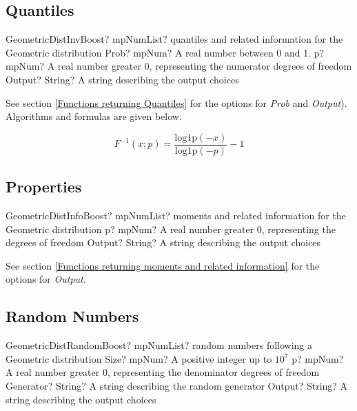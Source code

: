 \subsection{Quantiles}

\begin{mpFunctionsExtract}
	\mpFunctionThreeNotImplemented
	{GeometricDistInvBoost? mpNumList? quantiles and related information for the Geometric distribution}
	{Prob? mpNum? A real number between 0 and 1.}
	{p? mpNum? A real number greater 0, representing the numerator  degrees of freedom}
	{Output? String? A string describing the output choices}
\end{mpFunctionsExtract}

See section \ref{Functions returning Quantiles} for the options for  {\itshape\sffamily Prob} and {\itshape\sffamily Output}). Algorithms and formulas are given below.

\begin{equation} 
	F^{-1}(x;p)= \frac{\text{log1p}(-x)}{\text{log1p}(-p)} -1
\end{equation}



\subsection{Properties}
\label{GeometricDistributionProperties}


\begin{mpFunctionsExtract}
	\mpFunctionTwoNotImplemented
	{GeometricDistInfoBoost? mpNumList? moments and related information for the Geometric distribution}
	{p? mpNum? A real number greater 0, representing the degrees of freedom}
	{Output? String? A string describing the output choices}
\end{mpFunctionsExtract}

\vspace{0.3cm}

See section \ref{Functions returning moments and related information} for the options for {\itshape\sffamily Output}. 




\subsection{Random Numbers}
\begin{mpFunctionsExtract}
	\mpFunctionFourNotImplemented
	{GeometricDistRandomBoost? mpNumList? random numbers following a Geometric distribution}
	{Size? mpNum? A positive integer up to $10^7$}
	{p? mpNum? A real number greater 0, representing the denominator degrees of freedom}
	{Generator? String? A string describing the random generator}
	{Output? String? A string describing the output choices}
\end{mpFunctionsExtract}

